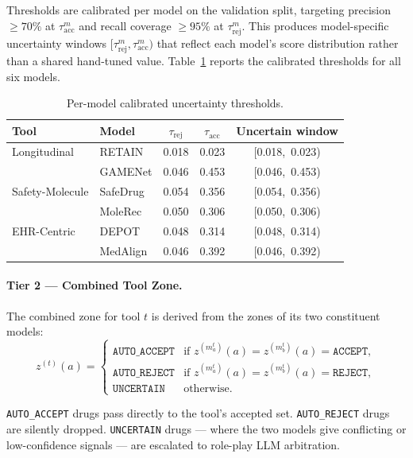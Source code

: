 \documentclass[sigconf,anonymous]{acmart}
\begin{document}
Thresholds are calibrated per model on the validation split, targeting precision $\geq 70\%$ at $\tau_{\text{acc}}^m$ and recall coverage $\geq 95\%$ at $\tau_{\text{rej}}^m$. This produces model-specific uncertainty windows $[\tau_{\text{rej}}^m, \tau_{\text{acc}}^m)$ that reflect each model's score distribution rather than a shared hand-tuned value. Table~\ref{tab:thresholds} reports the calibrated thresholds for all six models.

\begin{table}[h]
\centering
\caption{Per-model calibrated uncertainty thresholds.}
\label{tab:thresholds}
\begin{tabular}{llccc}
\hline
\textbf{Tool} & \textbf{Model} & $\tau_{\text{rej}}$ & $\tau_{\text{acc}}$ & \textbf{Uncertain window} \\
\hline
Longitudinal      & RETAIN    & 0.018 & 0.023 & [0.018,\ 0.023) \\
                  & GAMENet   & 0.046 & 0.453 & [0.046,\ 0.453) \\
Safety-Molecule   & SafeDrug  & 0.054 & 0.356 & [0.054,\ 0.356) \\
                  & MoleRec   & 0.050 & 0.306 & [0.050,\ 0.306) \\
EHR-Centric       & DEPOT     & 0.048 & 0.314 & [0.048,\ 0.314) \\
                  & MedAlign  & 0.046 & 0.392 & [0.046,\ 0.392) \\
\hline
\end{tabular}
\end{table}

\paragraph{Tier 2 — Combined Tool Zone.}
The combined zone for tool $t$ is derived from the zones of its two constituent models:
\begin{equation}
z^{(t)}(a) =
\begin{cases}
\texttt{AUTO\_ACCEPT} & \text{if } z^{(m_a^t)}(a) = z^{(m_b^t)}(a) = \texttt{ACCEPT}, \\
\texttt{AUTO\_REJECT} & \text{if } z^{(m_a^t)}(a) = z^{(m_b^t)}(a) = \texttt{REJECT}, \\
\texttt{UNCERTAIN}    & \text{otherwise.}
\end{cases}
\end{equation}

\texttt{AUTO\_ACCEPT} drugs pass directly to the tool's accepted set. \texttt{AUTO\_REJECT} drugs are silently dropped. \texttt{UNCERTAIN} drugs — where the two models give conflicting or low-confidence signals — are escalated to role-play LLM arbitration.
\end{document}
